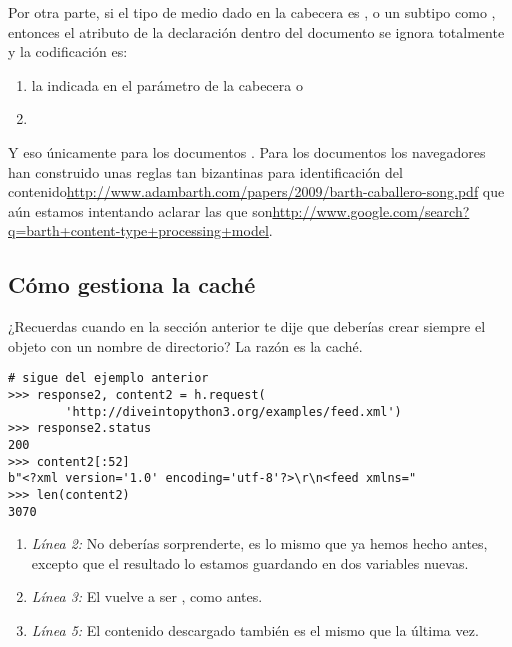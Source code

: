 Por otra parte, si el tipo de medio dado en la cabecera  es ,  o un subtipo como , entonces el atributo  de la declaración dentro del documento  se ignora totalmente y la codificación es:

\begin{enumerate}

\item la indicada en el parámetro  de la cabecera  o

\item {}

\end{enumerate}

Y eso únicamente para los documentos . Para los documentos  los navegadores han construido unas reglas tan bizantinas para identificación del contenido\href{http://www.adambarth.com/papers/2009/barth-caballero-song.pdf}{http://www.adambarth.com/papers/2009/barth-caballero-song.pdf} que aún estamos intentando aclarar las que son\href{http://www.google.com/search?q=barth+content-type+processing+model}{http://www.google.com/search?q=barth+content-type+processing+model}.

\subsection{Cómo  gestiona la caché}

¿Recuerdas cuando en la sección anterior te dije que deberías crear siempre el objeto  con un nombre de directorio? La razón es la caché.

\noindent\begin{minipage}{\textwidth}
\begin{lstlisting}[mathescape=True]
# sigue del ejemplo anterior
>>> response2, content2 = h.request(
        'http://diveintopython3.org/examples/feed.xml') 
>>> response2.status                    
200
>>> content2[:52]                      
b"<?xml version='1.0' encoding='utf-8'?>\r\n<feed xmlns="
>>> len(content2)
3070
\end{lstlisting}
\end{minipage}

\begin{enumerate}

\item \emph{Línea 2:} No deberías sorprenderte, es lo mismo que ya hemos hecho antes, excepto que el resultado lo estamos guardando en dos variables nuevas.

\item \emph{Línea 3:} El  vuelve a ser , como antes.

\item \emph{Línea 5:} El contenido descargado también es el mismo que la última vez.

\end{enumerate}

